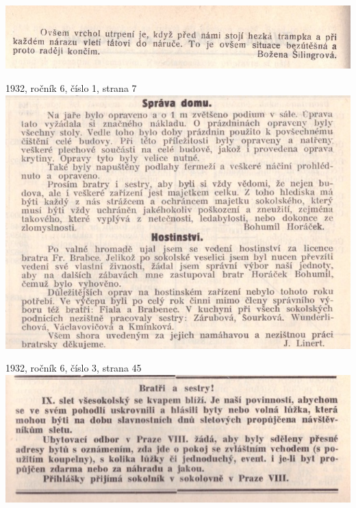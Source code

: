 \documentclass[11pt]{article}
\begin{document}
\includegraphics[width=\imagewidth]{original/1931/Skener_20250315 (9).jpg}





\vspace*{\baselineskip}
1932, ročník 6, číslo 1, strana 7 \\
\includegraphics[width=\imagewidth]{original/1932/Skener_20250320 (5).jpg}

\vspace*{\baselineskip}
1932, ročník 6, číslo 3, strana 45 \\
\includegraphics[width=\imagewidth]{original/1932/Skener_20250320 (6).jpg}
\end{document}
